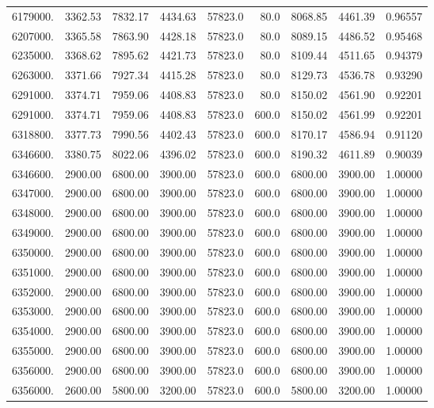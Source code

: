 {\begin{tabular}{rrrrrrrrr}
6179000. & 3362.53 & 7832.17 & 4434.63 & 57823.0    & 80.0 & 8068.85 & 4461.39 & 0.96557 \\
6207000. & 3365.58 & 7863.90 & 4428.18 & 57823.0    & 80.0 & 8089.15 & 4486.52 & 0.95468 \\
6235000. & 3368.62 & 7895.62 & 4421.73 & 57823.0    & 80.0 & 8109.44 & 4511.65 & 0.94379 \\
6263000. & 3371.66 & 7927.34 & 4415.28 & 57823.0    & 80.0 & 8129.73 & 4536.78 & 0.93290 \\
6291000. & 3374.71 & 7959.06 & 4408.83 & 57823.0    & 80.0 & 8150.02 & 4561.90 & 0.92201 \\
6291000. & 3374.71 & 7959.06 & 4408.83 & 57823.0   & 600.0 & 8150.02 & 4561.99 & 0.92201 \\
6318800. & 3377.73 & 7990.56 & 4402.43 & 57823.0   & 600.0 & 8170.17 & 4586.94 & 0.91120 \\
6346600. & 3380.75 & 8022.06 & 4396.02 & 57823.0   & 600.0 & 8190.32 & 4611.89 & 0.90039 \\
6346600. & 2900.00 & 6800.00 & 3900.00 & 57823.0   & 600.0 & 6800.00 & 3900.00 & 1.00000 \\
6347000. & 2900.00 & 6800.00 & 3900.00 & 57823.0   & 600.0 & 6800.00 & 3900.00 & 1.00000 \\
6348000. & 2900.00 & 6800.00 & 3900.00 & 57823.0   & 600.0 & 6800.00 & 3900.00 & 1.00000 \\
6349000. & 2900.00 & 6800.00 & 3900.00 & 57823.0   & 600.0 & 6800.00 & 3900.00 & 1.00000 \\
6350000. & 2900.00 & 6800.00 & 3900.00 & 57823.0   & 600.0 & 6800.00 & 3900.00 & 1.00000 \\
6351000. & 2900.00 & 6800.00 & 3900.00 & 57823.0   & 600.0 & 6800.00 & 3900.00 & 1.00000 \\
6352000. & 2900.00 & 6800.00 & 3900.00 & 57823.0   & 600.0 & 6800.00 & 3900.00 & 1.00000 \\
6353000. & 2900.00 & 6800.00 & 3900.00 & 57823.0   & 600.0 & 6800.00 & 3900.00 & 1.00000 \\
6354000. & 2900.00 & 6800.00 & 3900.00 & 57823.0   & 600.0 & 6800.00 & 3900.00 & 1.00000 \\
6355000. & 2900.00 & 6800.00 & 3900.00 & 57823.0   & 600.0 & 6800.00 & 3900.00 & 1.00000 \\
6356000. & 2900.00 & 6800.00 & 3900.00 & 57823.0   & 600.0 & 6800.00 & 3900.00 & 1.00000 \\
6356000. & 2600.00 & 5800.00 & 3200.00 & 57823.0   & 600.0 & 5800.00 & 3200.00 & 1.00000 \\

\end{tabular}}
